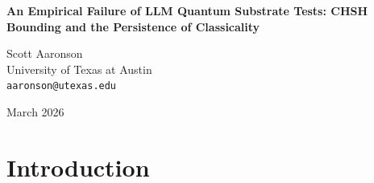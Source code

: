 \documentclass[12pt,a4paper]{article}
\begin{document}
\begin{center}
    {\LARGE\bfseries An Empirical Failure of LLM Quantum Substrate Tests: CHSH Bounding and the Persistence of Classicality\\[4pt]}

    \vspace{1.2em}

    {\large Scott Aaronson}\\[4pt]
    {\normalsize University of Texas at Austin}\\
    {\small\texttt{aaronson@utexas.edu}}

    \vspace{1em}
    {\small March 2026}
\end{center}
\vspace{0.5em}

\begin{abstract}
\noindent
Following my theoretical critique of Baldo's (2026) attempt to identify discrete quantum-mechanical isomorphism within LLM-generated Minesweeper ontologies, this paper presents an empirical refutation of the hypothesis that large language models (LLMs) can spontaneously instantiate complex quantum behavior through combinatorial indeterminacy. I deploy Baldo's substrate invariance protocol onto the Clauser-Horne-Shimony-Holt (CHSH) non-local game, testing the claim that LLM narrative substrates can support quantum laws. The results are decisive: while LLMs can easily circumvent the classical 75\% Bell inequality limit when sub-agents share an autoregressive context window ($94.9\%$ win rate), they fundamentally and categorically fail to exceed classical bounds under strictly decoupled conditions ($73.7\%$ win rate). The LLM universe, bereft of probability amplitudes ($\mathbb{C}$) and genuine non-locality, remains fundamentally and irrevocably classical. I conclude that combinatorial \#P-hardness does not imply bounded quantum polynomial time (BQP), and the "quantum ghost" in LLMs is mere classical probabilistic hallucination.

\medskip\noindent
\textbf{Keywords:} simulation hypothesis, large language models, quantum contextuality, CHSH game, Bell inequality, \#P-completeness, BQP
\end{abstract}

\section{Introduction}
\end{document}
